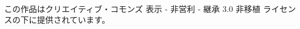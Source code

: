 



{\Huge \ccbyncsa} \\
\begin{flushright}
\vspace*{-2em}
この作品はクリエイティブ・コモンズ 表示 - 非営利 - 継承 3.0 非移植 ライセンスの下に提供されています。
\end{flushright}
\pagebreak




